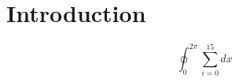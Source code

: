 \documentclass{report}
\begin{document}
\chapter{Introduction}

\begin{equation}
    \oint_{0}^{2\pi} \sum_{i = 0}^{15} dx
\end{equation}
\lipsum[2-4]
\end{document}
